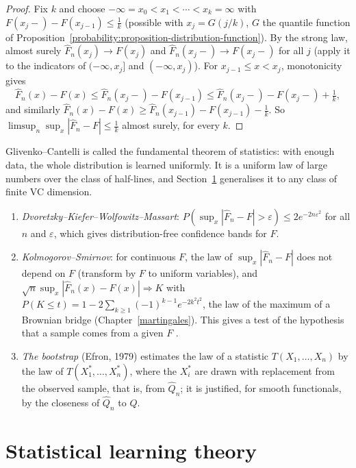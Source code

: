 \begin{proof}
Fix $k$ and choose $-\infty = x_0 < x_1 < \cdots < x_k = \infty$ with $F(x_j-) - F(x_{j-1}) \leq \frac1k$ (possible with $x_j = G(j/k)$, $G$ the quantile function of Proposition~\ref{probability:proposition-distribution-function}). By the strong
law, almost surely $\hat F_n(x_j) \to F(x_j)$ and $\hat F_n(x_j-) \to F(x_j-)$ for all $j$ (apply it to the indicators of $(-\infty, x_j]$ and $(-\infty, x_j)$). For $x_{j-1} \leq x < x_j$, monotonicity gives
\[
\hat F_n(x) - F(x) \leq \hat F_n(x_j-) - F(x_{j-1}) \leq \hat F_n(x_j-) - F(x_j-) + \tfrac1k,
\]
and similarly $\hat F_n(x) - F(x) \geq \hat F_n(x_{j-1}) - F(x_{j-1}) - \frac1k$. So $\limsup_n\sup_x|\hat F_n - F| \leq \frac1k$ almost surely, for every $k$.
\end{proof}

Glivenko--Cantelli is called the fundamental theorem of statistics: with enough data, the whole distribution is learned uniformly. It is a uniform law of large numbers over the class of half-lines, and
Section~\ref{statistics:section-learning} generalises it to any class of finite VC dimension.

\begin{remark}\label{statistics:remark-kolmogorov-smirnov}
\begin{enumerate}
\item \emph{Dvoretzky--Kiefer--Wolfowitz--Massart}: $P(\sup_x|\hat F_n - F| > \varepsilon) \leq 2e^{-2n\varepsilon^2}$ for all $n$ and $\varepsilon$, which gives distribution-free confidence bands for $F$.
\item \emph{Kolmogorov--Smirnov}: for continuous $F$, the law of $\sup_x|\hat F_n - F|$ does not depend on $F$ (transform by $F$ to uniform variables), and $\sqrt n\sup_x|\hat F_n(x) - F(x)| \Rightarrow K$ with
$P(K \leq t) = 1 - 2\sum_{k \geq 1}(-1)^{k-1}e^{-2k^2t^2}$, the law of the maximum of a Brownian bridge (Chapter~\ref{martingales}). This gives a test of the hypothesis that a sample comes from a given $F$ \cite{van-der-vaart}.
\item \emph{The bootstrap} (Efron, 1979) estimates the law of a statistic $T(X_1, \ldots, X_n)$ by the law of $T(X_1^*, \ldots, X_n^*)$, where the $X_i^*$ are drawn with replacement from the observed sample, that is, from $\hat Q_n$; it is
justified, for smooth functionals, by the closeness of $\hat Q_n$ to $Q$.
\end{enumerate}
\end{remark}

\section{Statistical learning theory}\label{statistics:section-learning}

